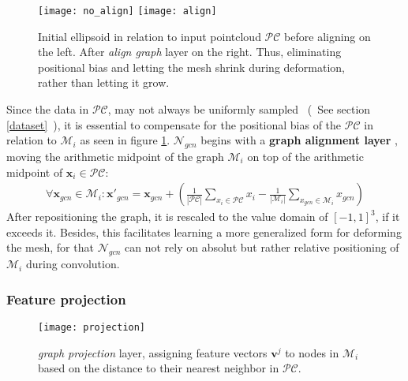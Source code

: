    \begin{figure}
      \centering
      \texttt{[image: no\_align]}
      \texttt{[image: align]}
      \caption{Initial ellipsoid in relation to input pointcloud $\mathcal{PC}$ before aligning on the left. After \emph{align graph} layer on the right.
      Thus, eliminating positional bias and letting the mesh shrink during deformation, rather than letting it grow.}
      \label{fig:align}
   \end{figure}

   
   Since the data in $\mathcal{PC}$, may not always be uniformly sampled ~(~See section \ref{dataset}~),
   it is essential to compensate for the positional bias of the $\mathcal{PC}$ in relation to $\mathcal{M}_{i}$ as seen in figure \ref{fig:align}. 
   $\mathcal{N}_{gcn}$ begins with a \textbf{graph alignment layer} , moving the arithmetic midpoint of the graph $\mathcal{M}_{i}$ 
   on top of the arithmetic midpoint of $\textbf{x}_i \in \mathcal{PC}$:
   \begin{align}
   \label{form:align}
   \forall \textbf{x}_{gcn} \in \mathcal{M}_i : \textbf{x}'_{gcn} = \textbf{x}_{gcn} + 
   (\frac{1}{|\mathcal{PC}|}\sum_{x_i \in \mathcal{PC}}x_i - \frac{1}{|\mathcal{M}_{i}|}\sum_{x_{gcn} \in \mathcal{M}_i}x_{gcn})
   \end{align}
   After repositioning the graph, it is rescaled to the value domain of $[-1,1]^3$, if it exceeds it.
   Besides, this facilitates learning a more generalized form for deforming the mesh, for that $\mathcal{N}_{gcn}$ can not rely on absolut but rather relative positioning of $\mathcal{M}_{i}$ during 
   convolution.

   \subsubsection*{Feature projection}
   \label{featureproj}
   \begin{figure}
      \begin{center}
      \texttt{[image: projection]}
      \caption{\emph{graph projection} layer, assigning feature vectors $\textbf{v}^j$ to nodes in
       $\mathcal{M}_i$ based on the distance to their nearest neighbor in $\mathcal{PC}$.}
      \label{fig:proj}
      \end{center}
   \end{figure}

